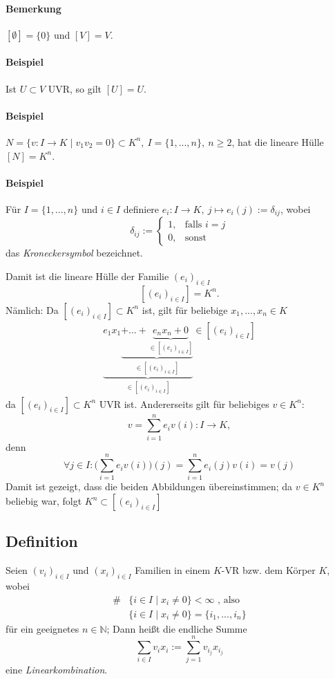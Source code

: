  	\paragraph{Bemerkung}
 		$[\emptyset ] = \{0\}$ und $[V] = V$.

 	\paragraph{Beispiel}
 		Ist $U\subset V$ UVR, so gilt $[U] = U$.

 	\paragraph{Beispiel}
 		$N=\{v:I\to K\mid v_1v_2=0\} \subset K^n,\ I=\{1,...,n\},\ n\geq 2$, hat die lineare Hülle $[N]=K^n$.

 	\paragraph{Beispiel}
 		Für $I=\{1,...,n\}$ und $i\in I$ definiere
 		$e_i:I\to K ,\ j\mapsto e_i(j):= \delta_{ij}$, wobei
 		\begin{equation*}
 			\delta_{ij} :=
 			\begin{cases}
 				1, & \text{falls }i=j \\
 				0, & \text{sonst}
 			\end{cases}
 		\end{equation*}
 		das \emph{Kroneckersymbol} bezeichnet.

 		Damit ist die lineare Hülle der Familie $(e_i)_{i\in I}$
 		\[
 			[(e_i)_{i\in I}] = K^n.
 		\]
 		Nämlich: Da $[(e_i)_{i\in I}]\subset K^n$ ist, gilt für beliebige $x_1,...,x_n\in K$
 		\begin{gather*}
 			\underbrace{e_1x_1\underbrace{+...+\underbrace{e_nx_n + 0}_{\in [(e_i)_{i\in I}]}}_{\in [(e_i)_{i\in I}]}}_{\in [(e_i)_{i\in I}]}\in [(e_i)_{i\in I}]
 		\end{gather*}
 		da $[(e_i)_{i\in I}] \subset K^n$ UVR ist.
 		Andererseits gilt für beliebiges $v\in K^n$:
 		\[
 			v=\sum^n_{i=1}e_iv(i): I\to K,
 		\]
 		denn
 		\[
 			\forall j\in I: \bigg(\sum^n_{i=1} e_iv(i)\bigg)(j) = \sum^n_{i=1}e_i(j)v(i) = v(j)
 		\]
 		Damit ist gezeigt, dass die beiden Abbildungen übereinstimmen; da $v\in K^n$ beliebig war, folgt $K^n \subset [(e_i)_{i\in I}]$

 \subsection{Definition}
 	\begin{Definition}
 		Seien $(v_i)_{i\in I}$ und $(x_i)_{i\in I}$ Familien in einem $ K $-VR bzw. dem Körper $ K $, wobei
 		\begin{align*}
 			\# & \{i\in I\mid x_i \neq 0\} < \infty\text{ , also} \\
 			   & \{i\in I \mid x_i \neq 0\} = \{i_1,...,i_n\}
 		\end{align*}
 		für ein geeignetes  $n\in \mathbb{N}$;
 		Dann heißt die endliche Summe
 		\[
 			\sum_{i\in I} v_ix_i:= \sum^n_{j=1}v_{i_j}x_{i_j}
 		\]
 		eine \emph{Linearkombination}.
 	\end{Definition}


